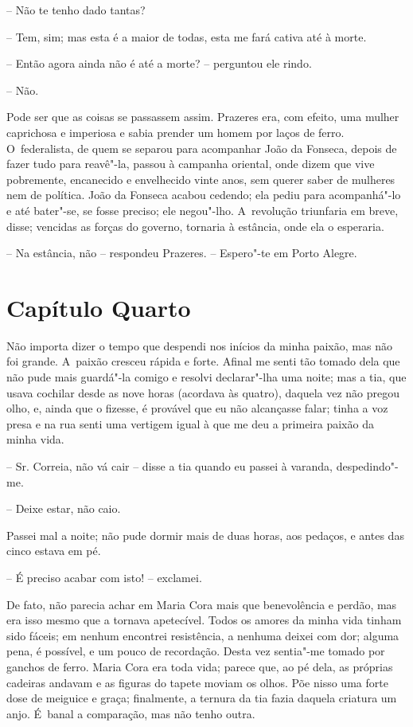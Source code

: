 -- Não te tenho dado tantas?

-- Tem, sim; mas esta é a maior de todas, esta me fará cativa até à
morte.

-- Então agora ainda não é até a morte? -- perguntou ele rindo.

-- Não.

Pode ser que as coisas se passassem assim. Prazeres era, com efeito, uma
mulher caprichosa e imperiosa e sabia prender um homem por laços de
ferro. O~federalista, de quem se separou para acompanhar João da
Fonseca, depois de fazer tudo para reavê"-la, passou à campanha oriental,
onde dizem que vive pobremente, encanecido e envelhecido vinte anos, sem
querer saber de mulheres nem de política. João da Fonseca acabou
cedendo; ela pediu para acompanhá"-lo e até bater"-se, se fosse preciso;
ele negou"-lho. A~revolução triunfaria em breve, disse; vencidas as
forças do governo, tornaria à estância, onde ela o esperaria.

-- Na estância, não -- respondeu Prazeres. -- Espero"-te em Porto Alegre.

\section{Capítulo Quarto}

Não importa dizer o tempo que despendi nos inícios da minha paixão, mas
não foi grande. A~paixão cresceu rápida e forte. Afinal me senti tão
tomado dela que não pude mais guardá"-la comigo e resolvi declarar"-lha
uma noite; mas a tia, que usava cochilar desde as nove horas (acordava
às quatro), daquela vez não pregou olho, e, ainda que o fizesse, é
provável que eu não alcançasse falar; tinha a voz presa e na rua senti
uma vertigem igual à que me deu a primeira paixão da minha vida.

-- Sr. Correia, não vá cair -- disse a tia quando eu passei à varanda,
despedindo"-me.

-- Deixe estar, não caio.

Passei mal a noite; não pude dormir mais de duas horas, aos pedaços, e
antes das cinco estava em pé.

-- É preciso acabar com isto! -- exclamei.

De fato, não parecia achar em Maria Cora mais que benevolência e perdão,
mas era isso mesmo que a tornava apetecível. Todos os amores da minha
vida tinham sido fáceis; em nenhum encontrei resistência, a nenhuma
deixei com dor; alguma pena, é possível, e um pouco de recordação. Desta
vez sentia"-me tomado por ganchos de ferro. Maria Cora era toda vida;
parece que, ao pé dela, as próprias cadeiras andavam e as figuras do
tapete moviam os olhos. Põe nisso uma forte dose de meiguice e graça;
finalmente, a ternura da tia fazia daquela criatura um anjo. É~banal a
comparação, mas não tenho outra.


